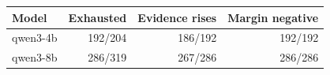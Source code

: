\begin{tabular}{lrrr}
\toprule
Model & Exhausted & Evidence rises & Margin negative \\
\midrule
qwen3-4b & 192/204 & 186/192 & 192/192 \\
qwen3-8b & 286/319 & 267/286 & 286/286 \\
\bottomrule
\end{tabular}
